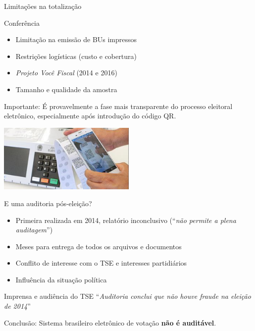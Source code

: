 \documentclass[10pt]{beamer}
\begin{document}
\begin{frame}[fragile]{Limitações na totalização}

\begin{block}{\alert{Conferência}}
\begin{itemize}
 \item Limitação na emissão de BUs impressos
 \item Restrições logísticas (custo e cobertura)
 \item \emph{Projeto Você Fiscal} (2014 e 2016)
 \item Tamanho e qualidade da amostra
\end{itemize}
\end{block}

\alert{Importante:} É provavelmente a fase mais transparente do processo eleitoral eletrônico, especialmente após introdução do código QR.

\begin{flushright}
\includegraphics[width=0.5\textwidth]{qrcode.png}
\end{flushright}

\end{frame}

\begin{frame}{E uma auditoria pós-eleição?}
\begin{itemize}
\item Primeira realizada em 2014, relatório inconclusivo (``\emph{não permite a plena auditagem}'')
\item Meses para entrega de todos os arquivos e documentos
\item Conflito de interesse com o TSE e interesses partidiários
\item Influência da situação política
\end{itemize}

\bigskip

\begin{block}{Imprensa e audiência do TSE}
``\emph{Auditoria conclui que não houve fraude na eleição de 2014}''
\end{block}

\bigskip

\alert{Conclusão:} Sistema brasileiro eletrônico de votação {\bf não é auditável}.
\end{frame}
\end{document}
